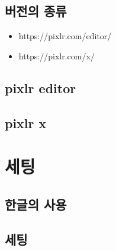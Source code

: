 \documentclass[12pt, a4paper, oneside]{book}
\let\stdsection\section
\renewcommand\section{\newpage\stdsection}
\begin{document}
		\section{버전의 종류}




\begin{itemize}[					
		topsep=0.0em,			
		parsep=0.0em,			
		itemsep=0em,			
		leftmargin=		6	em,
		labelwidth=3em,			
		labelsep=3em			
]					
	\item	https://pixlr.com/editor/
	\item	https://pixlr.com/x/
\end{itemize}					

		\section{pixlr editor}

		\section{pixlr x}






	\chapter{	세팅	} 
	\noptcrule
	\newpage
	\minitoc				


		\section{한글의 사용}


		\section{	세팅				}
\end{document}
